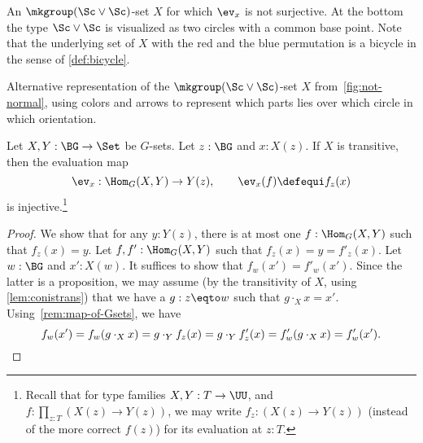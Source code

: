 \begin{marginfigure}
  \caption{An $\mkgroup(\Sc\vee\Sc)$-set $X$ for which $\protect\ev_x$ is not
   surjective. At the bottom the type $\Sc\vee\Sc$ is visualized as
   two circles with a common base point. Note that the underlying
   set of $X$ with the red and the blue permutation is a bicycle
   in the sense of \cref{def:bicycle}.}
  \label{fig:not-normal}
\end{marginfigure}

\begin{marginfigure}
  \noindent{}
  \caption{Alternative representation of the $\mkgroup(\Sc\vee\Sc)$-set
    $X$ from~\cref{fig:not-normal},
    using colors and arrows to represent which
    parts lies over which circle in which orientation.}
  \label{fig:not-normal-graph}
\end{marginfigure}

\begin{lemma}
  \label{lem:evisinjwhentransitive}
  Let $X,Y:\BG\to\Set$ be $G$-sets. Let $z:\BG$ and $x:X(z)$.
  If $X$ is transitive, then the evaluation map
  \[
    \ev_x:\Hom_G(X, Y)\to Y(z),\qquad \ev_x(f)\defequi f_z(x)
  \]
  is injective.\footnote{%
    Recall that for type families $X,Y:T\to\UU$, and
    $f:\prod_{z:T}(X(z)\to Y(z))$, we may write $f_z:(X(z)\to Y(z))$
    (instead of the more correct $f(z)$) for its evaluation at $z:T$.}
\end{lemma}
\begin{proof}
  We show that for any $y:Y(z)$, there is at most one
  $f:\Hom_G(X,Y)$ such that $f_z(x)=y$.
  Let $f,f':\Hom_G(X,Y)$ such that $f_z(x)=y=f'_z(x)$.
  Let $w:\BG$ and  $x':X(w)$. It suffices to show that $f_w(x')=f'_w(x')$.
  Since the latter is a proposition, we may assume (by the transitivity 
  of $X$, using \cref{lem:conistrans}) that we have a $g:z\eqto w$ such 
  that $g\cdot_X x=x'$. Using~\cref{rem:map-of-Gsets}, we have
  \[
    f_w(x')=f_w(g\cdot_X x)=g \cdot_Y f_z(x)=
    g \cdot_Y f'_z(x) = f'_w(g\cdot_X x) = f'_w(x').\qedhere
  \]
\end{proof}

